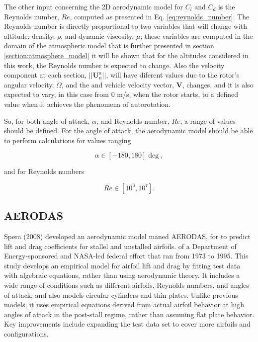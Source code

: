 The other input concerning the 2D aerodynamic model for $C_l$ and $C_d$ is the Reynolds number, $Re$, computed as presented in Eq. \ref{eq:reynolds_number}. The Reynolds number is directly proportional to two variables that will change with altitude: density, $\rho$, and dynamic viscosity, $\mu$; these variables are computed in the domain of the atmospheric model that is further presented in section \ref{section:atmosphere_model} it will be shown that for the altitudes considered in this work, the Reynolds number is expected to change. Also the velocity component at each section, $||\mathbf{U}^a_n||$, will have diferent values due to the rotor's angular velocity, $\Omega$, and the and vehicle velocity vector, $\mathbf{V}$, changes, and it is also expected to vary, in this case from 0 \unit{m/s}, when the rotor starts, to a defined value when it achieves the phenomena of autorotation.

So, for both angle of attack, $\alpha$, and Reynolds number, $Re$, a range of values should be defined. For the angle of attack, the aerodynamic model should be able to perform calculations for values ranging 

\begin{equation}
    \alpha \in [-180, 180] \unit{\deg},
\end{equation}

and for Reynolds numbers

\begin{equation}
    Re \in [10^3, 10^7].
\end{equation}

\subsection{AERODAS}
\label{sec:aerodas}

Spera (2008) \cite{spera_models_2008} developed an aerodynamic model  maned AERODAS, for to predict lift and drag coefficients for stallel and unstalled airfoils.   of a Department of Energy-sponsored and NASA-led federal effort that ran from 1973 to 1995. This study develops an empirical model for airfoil lift and drag by fitting test data with algebraic equations, rather than using aerodynamic theory. It includes a wide range of conditions such as different airfoils, Reynolds numbers, and angles of attack, and also models circular cylinders and thin plates.  Unlike previous models, it uses empirical equations derived from actual airfoil behavior at high angles of attack in the post-stall regime, rather than assuming flat plate behavior. Key improvements include expanding the test data set to cover more airfoils and configurations.

